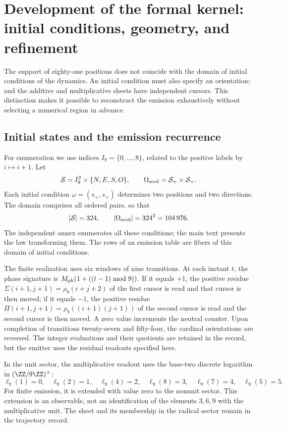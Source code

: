 \section{Development of the formal kernel: initial conditions, geometry, and refinement}
\label{sec:extension}

The support of eighty-one positions does not coincide with the domain of initial conditions of the dynamics. An initial condition must also specify an orientation; and the additive and multiplicative sheets have independent cursors. This distinction makes it possible to reconstruct the emission exhaustively without selecting a numerical region in advance.

\subsection{Initial states and the emission recurrence}

For enumeration we use indices \(I_9=\{0,\ldots,8\}\), related to the positive labels by \(i\mapsto i+1\). Let
\[
 \mathcal S=I_9^2\times\{N,E,S,O\},\qquad
 \Omega_{\rm seed}=\mathcal S_+\times\mathcal S_\times.
\]
Each initial condition \(\omega=(s_+,s_\times)\) determines two positions and two directions. The domain comprises all ordered pairs, so that
\begin{equation}
 |\mathcal S|=324,\qquad |\Omega_{\rm seed}|=324^2=104\,976.
 \label{eq:semillas}
\end{equation}
The independent annex enumerates all these conditions; the main text presents the law transforming them. The rows of an emission table are fibers of this domain of initial conditions.

The finite realization uses six windows of nine transitions. At each instant \(t\), the phase signature is \(M_{\rm ph}(1+((t-1)\bmod9))\). If it equals \(+1\), the positive residue \(\Sigma(i+1,j+1)=\rho_9(i+j+2)\) of the first cursor is read and that cursor is then moved; if it equals \(-1\), the positive residue \(\Pi(i+1,j+1)=\rho_9((i+1)(j+1))\) of the second cursor is read and the second cursor is then moved. A zero value increments the neutral counter. Upon completion of transitions twenty-seven and fifty-four, the cardinal orientations are reversed. The integer evaluations and their quotients are retained in the record, but the emitter uses the residual readouts specified here.

In the unit sector, the multiplicative readout uses the base-two discrete logarithm in \((\ZZ/9\ZZ)^\times\):
\[
 \ell_9(1)=0,\quad\ell_9(2)=1,\quad\ell_9(4)=2,\quad
 \ell_9(8)=3,\quad\ell_9(7)=4,\quad\ell_9(5)=5.
\]
For finite emission, it is extended with value zero to the nonunit sector. This extension is an observable, not an identification of the elements \(3,6,9\) with the multiplicative unit. The sheet and its membership in the radical sector remain in the trajectory record.

